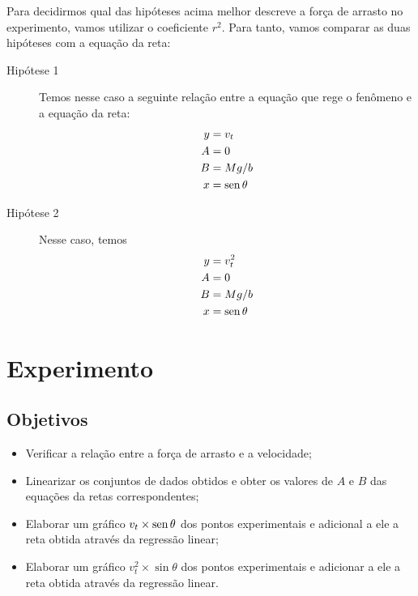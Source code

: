 Para decidirmos qual das hipóteses acima melhor descreve a força de arrasto no experimento, vamos utilizar o coeficiente $r^2$. Para tanto, vamos comparar as duas hipóteses com a equação da reta:
\begin{description}
	\item[Hipótese 1] Temos nesse caso a seguinte relação entre a equação que rege o fenômeno e a equação da reta:
		\begin{align}
			y &= v_t \\
			A &= 0 \\
			B &= Mg/b \\
			x &= \operatorname{sen}\theta
		\end{align}

	\item[Hipótese 2] Nesse caso, temos
		\begin{align}
			y &= v_t^2 \\
			A &= 0 \\
			B &= Mg/b \\
			x &= \operatorname{sen}\theta
		\end{align}
\end{description}

\section{Experimento}

\subsection{Objetivos}

\begin{itemize}
     \item Verificar a relação entre a força de arrasto e a velocidade;
	 \item Linearizar os conjuntos de dados obtidos e obter os valores de $A$ e $B$ das equações da retas correspondentes;
     \item Elaborar um gráfico $v_t \times \operatorname{sen}\theta$ dos pontos experimentais e adicional a ele a reta obtida através da regressão linear;
	 \item Elaborar um gráfico $v_t^2 \times \sin\theta$ dos pontos experimentais e adicionar a ele a reta obtida através da regressão linear.
\end{itemize}

